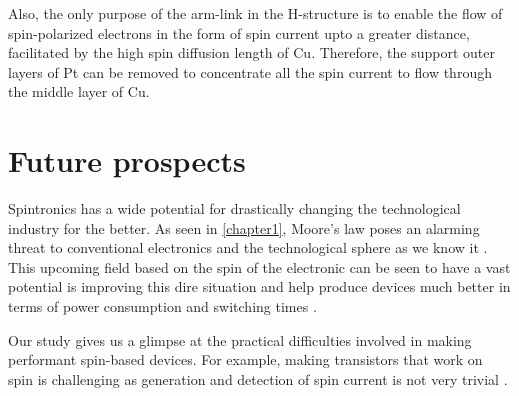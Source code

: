 Also, the only purpose of the arm-link in the \textsc{H}-structure is to enable the flow of spin-polarized electrons in the form of spin current upto a greater distance, facilitated by the high spin diffusion length of Cu.
Therefore, the support outer layers of Pt can be removed to concentrate all the spin current to flow through the middle layer of Cu.

\section{Future prospects}

Spintronics has a wide potential for drastically changing the technological industry for the better.
As seen in \cref{chapter1}, Moore's law poses an alarming threat to conventional electronics and the technological sphere as we know it \cite{moore1998cramming}.
This upcoming field based on the spin of the electronic can be seen to have a vast potential is improving this dire situation and help produce devices much better in terms of power consumption and switching times \cite{wolf2001spintronics}.

Our study gives us a glimpse at the practical difficulties involved in making performant spin-based devices.
For example, making transistors that work on spin is challenging as generation and detection of spin current is not very trivial \cite{vzutic2004spintronics}.
